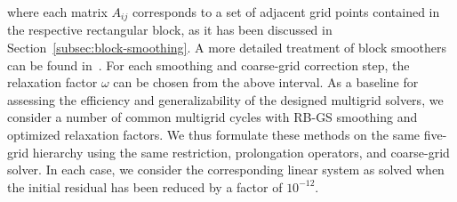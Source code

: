 where each matrix $A_{ij}$ corresponds to a set of adjacent grid points contained in the respective rectangular block, as it has been discussed in Section~\ref{subsec:block-smoothing}.
A more detailed treatment of block smoothers can be found in~\cite{trottenberg2000multigrid}.
For each smoothing and coarse-grid correction step, the relaxation factor $\omega$ can be chosen from the above interval.
As a baseline for assessing the efficiency and generalizability of the designed multigrid solvers, we consider a number of common multigrid cycles with RB-GS smoothing and optimized relaxation factors.
We thus formulate these methods on the same five-grid hierarchy using the same restriction, prolongation operators, and coarse-grid solver.
In each case, we consider the corresponding linear system as solved when the initial residual has been reduced by a factor of $10^{-12}$.

